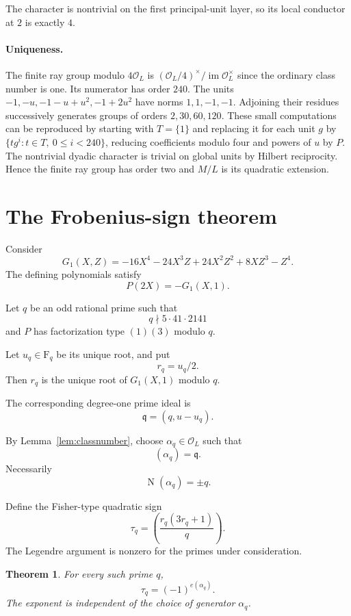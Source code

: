 \documentclass[11pt]{article}
\newtheorem{theorem}{Theorem}
\newcommand{\F}{\mathrm F}
\newcommand{\Ocal}{\mathcal O}
\newcommand{\Nm}{\operatorname{N}}
\begin{document}
The character is nontrivial on the
first principal-unit layer, so its
local conductor at $2$ is exactly $4$.

\paragraph{Uniqueness.}
The finite ray group modulo $4\Ocal_L$ is
$(\Ocal_L/4)^\times/\operatorname{im}\Ocal_L^\times$ since the
ordinary class number is one. Its numerator has order $240$.
The units $-1,-u,-1-u+u^2,-1+2u^2$ have norms $1,1,-1,-1$.
Adjoining their residues successively generates groups of orders
$2,30,60,120$. These small computations can be reproduced by starting
with $T=\{1\}$ and replacing it for each unit $g$ by
$\{t g^i:t\in T,\ 0\le i<240\}$, reducing coefficients modulo
four and powers of $u$ by $P$. The nontrivial dyadic character is
trivial on global units by Hilbert reciprocity. Hence the finite
ray group has order two and $M/L$ is its quadratic extension.

\section{The Frobenius-sign theorem}

Consider
\[
G_1(X,Z)=
-16X^4-24X^3Z+24X^2Z^2
+8XZ^3-Z^4.
\]
The defining polynomials satisfy
\[
P(2X)=-G_1(X,1).
\]

Let $q$ be an odd rational prime such that
\[
q\nmid 5\cdot41\cdot2141
\]
and $P$ has factorization type $(1)(3)$
modulo $q$.

Let $u_q\in\F_q$ be its unique root,
and put
\[
r_q=u_q/2.
\]
Then $r_q$ is the unique root of
$G_1(X,1)$ modulo $q$.

The corresponding degree-one prime ideal is
\[
\mathfrak q=(q,u-u_q).
\]

By Lemma~\ref{lem:classnumber}, choose
$\alpha_q\in\Ocal_L$ such that
\[
(\alpha_q)=\mathfrak q.
\]
Necessarily
\[
\Nm(\alpha_q)=\pm q.
\]

Define the Fisher-type quadratic sign
\[
\tau_q=
\left(\frac{r_q(3r_q+1)}q\right).
\]
The Legendre argument is nonzero for
the primes under consideration.

\begin{theorem}\label{thm:governing}
For every such prime $q$,
\[
\boxed{
\tau_q=(-1)^{e(\alpha_q)}.
}
\]
The exponent is independent of the
choice of generator $\alpha_q$.
\end{theorem}
\end{document}
